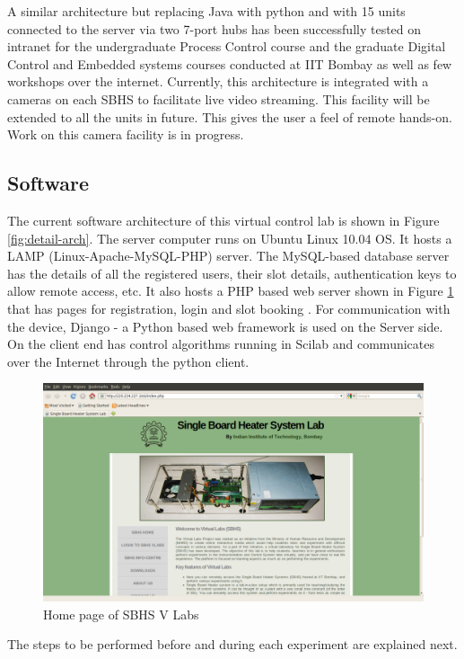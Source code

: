 A similar architecture but replacing Java with python and with 15 units connected to the server via two 7-port hubs has been successfully tested on intranet for the undergraduate Process Control course and the graduate Digital Control
and Embedded systems courses conducted at IIT Bombay as well as few workshops over the internet. Currently, this architecture is integrated with a cameras on each SBHS to facilitate live video streaming. This facility will be extended to all the units in future. This gives the user a feel of remote hands-on. Work on this camera facility is in progress.


\subsection{Software}
The current software architecture of this virtual control lab is shown
in Figure \ref{fig:detail-arch}. The server computer runs on Ubuntu
Linux 10.04 OS. It hosts a LAMP (Linux-Apache-MySQL-PHP) server. The
MySQL-based database server has the details of all the registered
users, their slot details, authentication keys to allow remote access,
etc. It also hosts a PHP based web server shown in Figure
\ref{fig:sbhs-website} that has pages for registration, login and slot
booking \cite{vl010}.  For communication with the device, Django - a Python based web framework is used on the Server side. On the client end has control
algorithms running in Scilab and communicates over the Internet
through the python client.

\begin{figure}
\includegraphics[width=\linewidth]{IEEE-Chile/figures/webpage}
\caption{Home page of SBHS V Labs}
\label{fig:sbhs-website}
\end{figure}
The steps to be performed before and during each experiment are explained next.

